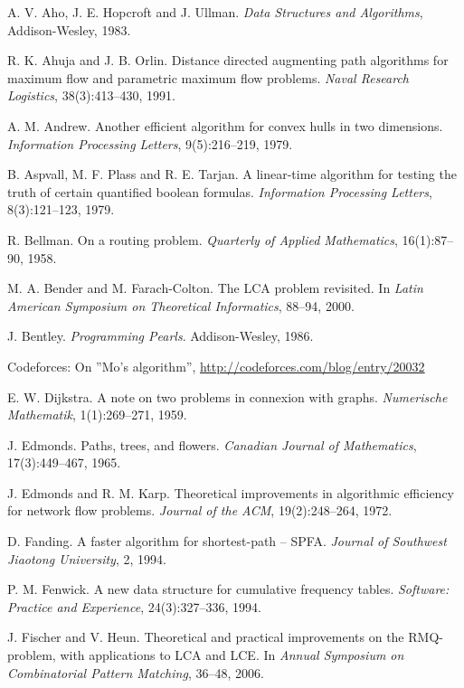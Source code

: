 \begin{thebibliography}{9}

  A. V. Aho, J. E. Hopcroft and J. Ullman.
  \emph{Data Structures and Algorithms},
  Addison-Wesley, 1983.

  R. K. Ahuja and J. B. Orlin.
  Distance directed augmenting path algorithms for maximum flow and parametric maximum flow problems.
  \emph{Naval Research Logistics}, 38(3):413--430, 1991.

  A. M. Andrew.
  Another efficient algorithm for convex hulls in two dimensions.
  \emph{Information Processing Letters}, 9(5):216--219, 1979.

  B. Aspvall, M. F. Plass and R. E. Tarjan.
  A linear-time algorithm for testing the truth of certain quantified boolean formulas.
  \emph{Information Processing Letters}, 8(3):121--123, 1979.

  R. Bellman.
  On a routing problem.
  \emph{Quarterly of Applied Mathematics}, 16(1):87--90, 1958.

  M. A. Bender and M. Farach-Colton.
  The LCA problem revisited. In
  \emph{Latin American Symposium on Theoretical Informatics}, 88--94, 2000.

  J. Bentley.
  \emph{Programming Pearls}.
  Addison-Wesley, 1986.

  Codeforces: On ''Mo's algorithm'',
  \url{http://codeforces.com/blog/entry/20032}

  E. W. Dijkstra.
  A note on two problems in connexion with graphs.
  \emph{Numerische Mathematik}, 1(1):269--271, 1959.

  J. Edmonds.
  Paths, trees, and flowers.
  \emph{Canadian Journal of Mathematics}, 17(3):449--467, 1965.

  J. Edmonds and R. M. Karp.
  Theoretical improvements in algorithmic efficiency for network flow problems.
  \emph{Journal of the ACM}, 19(2):248--264, 1972.

  D. Fanding.
  A faster algorithm for shortest-path -- SPFA.
  \emph{Journal of Southwest Jiaotong University}, 2, 1994.

  P. M. Fenwick.
  A new data structure for cumulative frequency tables.
  \emph{Software: Practice and Experience}, 24(3):327--336, 1994.

  J. Fischer and V. Heun.
  Theoretical and practical improvements on the RMQ-problem, with applications to LCA and LCE.
  In \emph{Annual Symposium on Combinatorial Pattern Matching}, 36--48, 2006.


\end{thebibliography}
